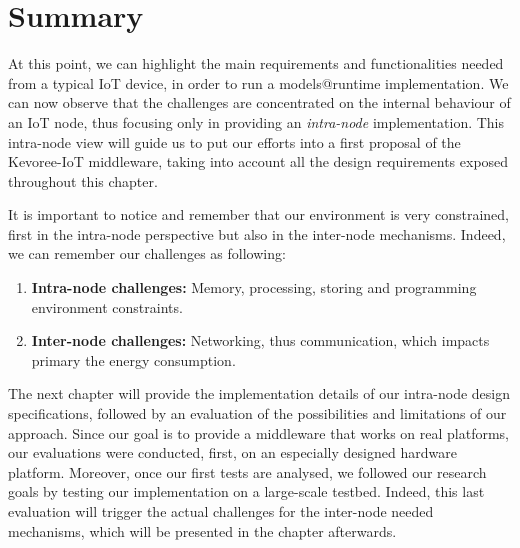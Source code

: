 


\section{Summary}
At this point, we can highlight the main requirements and functionalities needed from a typical IoT device, in order to run a models@runtime implementation.
We can now observe that the challenges are concentrated on the internal behaviour of an IoT node, thus focusing only in providing an \textit{intra-node} implementation.
This intra-node view will guide us to put our efforts into a first proposal of the Kevoree-IoT middleware, taking into account all the design requirements exposed throughout this chapter.

It is important to notice and remember that our environment is very constrained, first in the intra-node perspective but also in the inter-node mechanisms.
Indeed, we can remember our challenges as following:

\begin{enumerate}
	\item \textbf{Intra-node challenges:} Memory, processing, storing and programming environment constraints.
	\item \textbf{Inter-node challenges:} Networking, thus communication, which impacts primary the energy consumption.
\end{enumerate}


The next chapter will provide the implementation details of our intra-node design specifications, followed by an evaluation of the possibilities and limitations of our approach.
Since our goal is to provide a middleware that works on real platforms, our evaluations were conducted, first, on an especially designed hardware platform.
Moreover, once our first tests are analysed, we followed our research goals by testing our implementation on a large-scale testbed.
Indeed, this last evaluation will trigger the actual challenges for the inter-node needed mechanisms, which will be presented in the chapter afterwards.

